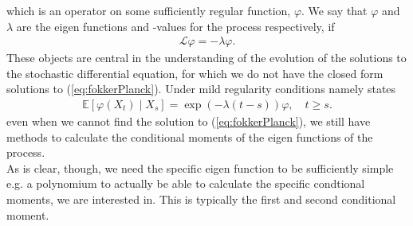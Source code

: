 which is an operator on some sufficiently regular function, $\varphi$. We say that $\varphi$ and $\lambda$ are the eigen functions and -values for the process respectively, if 
\begin{align}
    \mathcal{L}\varphi = -\lambda\varphi.
\end{align} 
These objects are central in the understanding of the evolution of the solutions to the stochastic differential equation, for which we do not have the closed form solutions to (\ref{eq:fokkerPlanck}). Under mild regularity conditions \cite[theorem 1.16]{StatisticalMethodsForSDE} namely states
\begin{align}
    \mathbb{E}\left[\varphi(X_{t}) \middle | X_{s}\right] = \exp\left(-\lambda \left(t - s\right)\right)\varphi \label{eq:momentConditions}, \quad t\geq s.
\end{align}
even when we cannot find the solution to (\ref{eq:fokkerPlanck}), we still have methods to calculate the conditional moments of the eigen functions of the process.\\
As is clear, though, we need the specific eigen function to be sufficiently simple e.g. a polynomium to actually be able to calculate the specific condtional moments, we are interested in. This is typically the first and second conditional moment.
